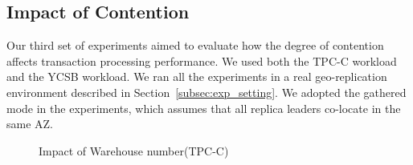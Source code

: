 \documentclass[conference]{IEEEtran}
\begin{document}
\subsection{Impact of Contention}

Our third set of experiments aimed to evaluate how the degree of contention affects transaction processing performance.
We used both the TPC-C workload and the YCSB workload.
We ran all the experiments in a real geo-replication environment described in Section~\ref{subsec:exp_setting}.
We adopted the gathered mode in the experiments, which assumes that all replica leaders co-locate in the same AZ.


\begin{figure}[tbp]
  \centering
      \caption{Impact of Warehouse number(TPC-C) }
      \label{fig:plot_tpcc_neworder_add_Warehouse_Warehouse_gather}
\end{figure}
\end{document}
